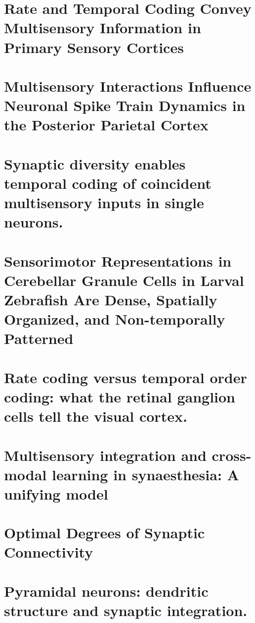 \documentclass[11pt, a4paper, oneside]{article}   	%
\begin{document}
\section{Rate and Temporal Coding Convey Multisensory Information in Primary Sensory Cortices \cite{Bieler2017}}

\begin{outline}
    \point
    
\end{outline}

\section{Multisensory Interactions Influence Neuronal Spike Train Dynamics in the Posterior Parietal Cortex \cite{VanGilder2016}}

\section{Synaptic diversity enables temporal coding of coincident multisensory inputs in single neurons. \cite{Chabrol2015}}
\section{Sensorimotor Representations in Cerebellar Granule Cells in Larval Zebrafish Are Dense, Spatially Organized, and Non-temporally Patterned \cite{Knogler2017}}

\section{Rate coding versus temporal order coding: what the retinal ganglion cells tell the visual cortex. \cite{VanRullen2001}}

\section{Multisensory integration and cross-modal learning in synaesthesia: A unifying model \cite{Newell2016}}

\section{Optimal Degrees of Synaptic Connectivity \cite{Litwin-Kumar2017}}

\section{Pyramidal neurons: dendritic structure and synaptic integration. \cite{Spruston2008}}
\end{document}
